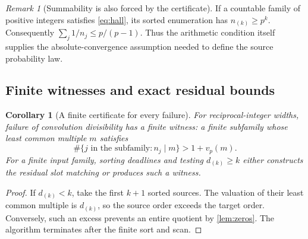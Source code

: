 \documentclass[11pt,a4paper]{article}
\newtheorem{corollary}[theorem]{Corollary}
\theoremstyle{remark}
\newtheorem{remark}[theorem]{Remark}
\begin{document}
\begin{remark}[Summability is also forced by the certificate]
If a countable family of positive integers satisfies \eqref{eq:hall}, its sorted
enumeration has $n_{(k)}\ge p^k$. Consequently
$\sum_j1/n_j\le p/(p-1)$. Thus the arithmetic condition itself supplies the
absolute-convergence assumption needed to define the source probability law.
\end{remark}

\subsection{Finite witnesses and exact residual bounds}

\begin{corollary}[A finite certificate for every failure]
\label{cor:witness}
For reciprocal-integer widths, failure of convolution divisibility has a finite
witness: a finite subfamily whose least common multiple $m$ satisfies
\[
 \#\{j\text{ in the subfamily}:n_j\mid m\}>1+v_p(m).
\]
For a finite input family, sorting deadlines and testing $d_{(k)}\ge k$ either
constructs the residual slot matching or produces such a witness.
\end{corollary}
\begin{proof}
If $d_{(k)}<k$, take the first $k+1$ sorted sources. The valuation of their
least common multiple is $d_{(k)}$, so the source order exceeds the target
order. Conversely, such an excess prevents an entire quotient by
\cref{lem:zeros}. The algorithm terminates after the finite sort and scan.
\end{proof}
\end{document}
